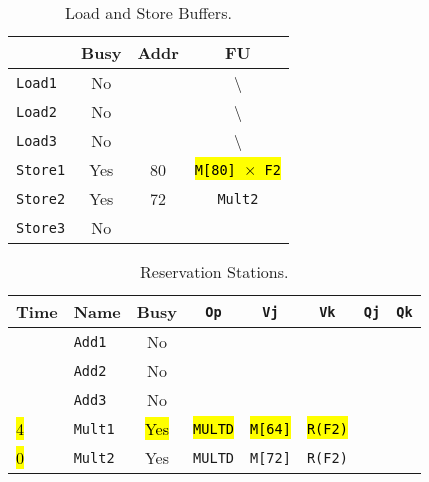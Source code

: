 \begin{enumerate}
    \begin{table}[!htp]
        \centering
        \begin{tabular}{@{} l | c c c @{}}
            \toprule
                                & Busy      & Addr      & FU   \\
            \midrule
            \texttt{Load1}      & No        &           & \textbackslash                    \\ [.3em]
            \texttt{Load2}      & No        &           & \textbackslash                    \\ [.3em]
            \texttt{Load3}      & No        &           & \textbackslash                    \\
            \cmidrule{1-4}
            \texttt{Store1}     & Yes       & 80        & \hl{\texttt{M[80] $\times$ F2}}   \\ [.3em]
            \texttt{Store2}     & Yes       & 72        & \texttt{Mult2}                    \\ [.3em]
            \texttt{Store3}     & No        &           &                                   \\
            \bottomrule
        \end{tabular}
        \caption*{Load and Store Buffers.}
    \end{table}

    \begin{table}[!htp]
        \centering
        \begin{tabular}{@{} l l | c c c c c c @{}}
            \toprule
            Time        & Name              & Busy      & \texttt{Op}           & \texttt{Vj}           & \texttt{Vk}           & \texttt{Qj}           & \texttt{Qk}       \\
            \midrule
                        & \texttt{Add1}     & No        &                       &                       &                       &                       &                   \\ [.3em]
                        & \texttt{Add2}     & No        &                       &                       &                       &                       &                   \\ [.3em]
                        & \texttt{Add3}     & No        &                       &                       &                       &                       &                   \\ [.3em]
            \hl{4}      & \texttt{Mult1}    & \hl{Yes}  & \hl{\texttt{MULTD}}   & \hl{\texttt{M[64]}}   & \hl{\texttt{R(F2)}}   &                       &                   \\ [.3em]
            \hl{0}      & \texttt{Mult2}    & Yes       & \texttt{MULTD}        & \texttt{M[72]}        & \texttt{R(F2)}        &                       &                   \\
            \bottomrule
        \end{tabular}
        \caption*{Reservation Stations.}
    \end{table}


\end{enumerate}
